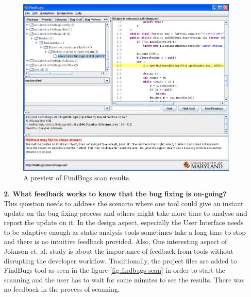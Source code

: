 \begin{figure}[hbt!]
	\centering
	\includegraphics[width=\linewidth]{figures/findbugs-results}
	\caption{A preview of FindBugs scan results.}
	\label{fig:findbugs-results}
\end{figure}

\clearpage

\textbf{2. What feedback works to know that the bug fixing is on-going?} \\

This question needs to address the scenario where one tool could give an instant update on the bug fixing process and others might take more time to analyse and report the update on it. In the design aspect, especially the User Interface needs to be adaptive \cite{NB18} enough as static analysis tools sometimes take a long time to stop and there is no intuitive feedback provided. Also, One interesting aspect of Johnson et. al. \cite{JSMB13} study is about the importance of feedback from tools without disrupting the developer workflow. Traditionally, the project files are added to FindBugs \cite{findbugs} tool as seen in the figure \ref{fig:findbugs-scan} in order to start the scanning and the user has to wait for some minutes to see the results. There was no feedback in the process of scanning. \\ \\

